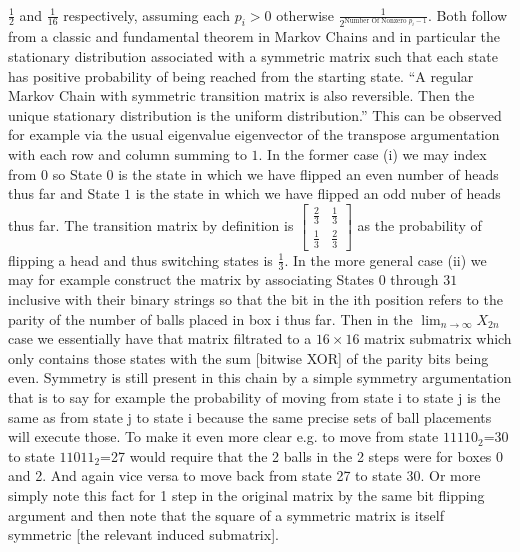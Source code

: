  \\
$\boxed{\frac{1}{2}}$ and $\boxed{\frac{1}{16}}$ respectively, assuming each $p_i>0$ otherwise $\frac{1}{2^{\text{Number Of Nonzero }p_i-1}}$. Both follow from a classic and fundamental theorem in Markov Chains and in particular the stationary distribution associated with a symmetric matrix such that each state has positive probability of being reached from the starting state. ``A regular Markov Chain with symmetric transition matrix is also reversible. Then the unique stationary distribution is the uniform distribution.'' This can be observed for example via the usual eigenvalue eigenvector of the transpose argumentation with each row and column summing to $1$. In the former case (i) we may index from $0$ so State $0$ is the state in which we have flipped an even number of heads thus far and State $1$ is the state in which we have flipped an odd nuber of heads thus far. The transition matrix by definition is $\begin{bmatrix} \frac{2}{3} & \frac{1}{3} \\ \frac{1}{3} & \frac{2}{3} \end{bmatrix}$ as the probability of flipping a head and thus switching states is $\frac{1}{3}$. In the more general case (ii) we may for example construct the matrix by associating States $0$ through $31$ inclusive with their binary strings so that the bit in the ith position refers to the parity of the number of balls placed in box i thus far. Then in the $\lim_{n\to \infty}X_{2n}$ case we essentially have that matrix filtrated to a $16 \times 16$ matrix submatrix which only contains those states with the sum [bitwise XOR] of the parity bits being even. Symmetry is still present in this chain by a simple symmetry argumentation that is to say for example the probability of moving from state i to state j is the same as from state j to state i because the same precise sets of ball placements will execute those. To make it even more clear e.g. to move from state $11110_2$=30 to state $11011_2$=27 would require that the 2 balls in the 2 steps were for boxes 0 and 2. And again vice versa to move back from state 27 to state 30. Or more simply note this fact for 1 step in the original matrix by the same bit flipping argument and then note that the square of a symmetric matrix is itself symmetric [the relevant induced submatrix].


